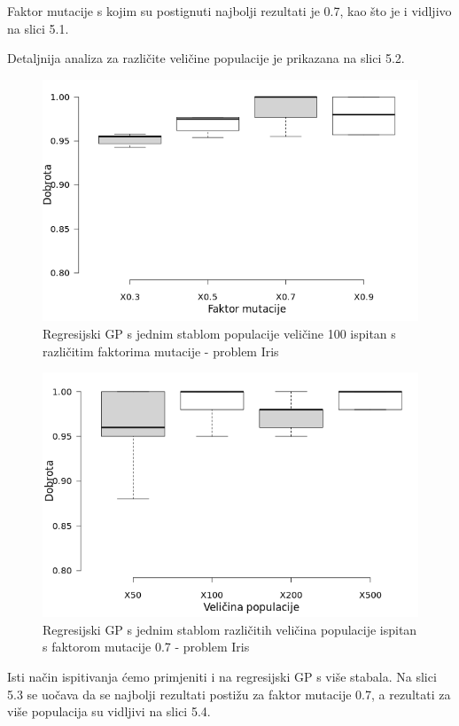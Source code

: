 \documentclass[times, utf8, zavrsni]{fer}
\begin{document}
Faktor mutacije s kojim su postignuti najbolji rezultati je 0.7, kao što je i vidljivo na slici 5.1.

Detaljnija analiza za različite veličine populacije je prikazana na slici 5.2.

\begin{figure}[htb]
\centering
\includegraphics[scale=0.5]{grafovi/boxplotIrisSTest3}
\caption{Regresijski GP s jednim stablom populacije veličine 100 ispitan s različitim faktorima mutacije - problem Iris}
\end{figure}

\begin{figure}[htb]
\centering
\includegraphics[scale=0.5]{grafovi/boxplotIrisS2}
\caption{Regresijski GP s jednim stablom različitih veličina populacije ispitan s faktorom mutacije 0.7 - problem Iris}
\end{figure}


Isti način ispitivanja ćemo primjeniti i na regresijski GP s više stabala.
Na slici 5.3 se uočava da se najbolji rezultati postižu za faktor mutacije 0.7, a rezultati za više populacija su vidljivi na slici 5.4.
\end{document}
